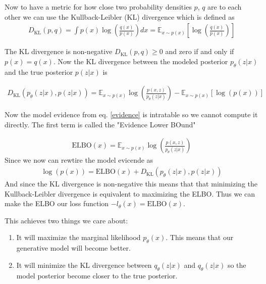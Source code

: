 Now to have a metric for how close two probability densities $p$, $q$ are to each other we can use the Kullback-Leibler (KL) divergence which is defined as
\begin{align}
D_{\text{KL}}(p,q) = \int p(x)\log \left(\frac{q(x)}{p(x)}\right) dx =  \mathbb{E}_{x\sim p(x)}\left[ \log\left(\frac{q(x)}{p(x)}\right)\right]
\end{align}

The KL divergence is non-negative $D_{\text{KL}}(p,q) \geq 0$ and zero if and only if $p(x) = q(x)$. Now the KL divergence  between the modeled posterior $ p_\theta(z|x)$ and the true posterior  $p(z|x)$ is

\begin{align}
    D_{\text{KL}}(p_\theta(z|x),p(z|x)) = \mathbb{E}_{x\sim p(x)} \log\left(\frac{p(x,z)}{p_\theta(z|x)}\right) -  \mathbb{E}_{x\sim p(x)} \left[\log(p(x))\right]
\end{align}

Now the model evidence from eq. \ref{evidence} is intratable so we cannot compute it directly. The first term is called the "Evidence Lower BOund" 

\begin{align}
    \text{ELBO}(x) = \mathbb{E}_{x\sim p(x)} \log\left(\frac{p(x,z)}{p_\theta(z|x)}\right)
\end{align}
Since we now can rewtire the model evicende as 
\begin{align}
    \log(p(x)) = \text{ELBO}(x) +  D_{\text{KL}}(p_\theta(z|x),p(z|x))
\end{align}
And since the KL divergence is non-negative this means that that minimizing the Kullback-Leibler divergence is equivalent to maximizing the ELBO. Thus we can make the ELBO our loss function $-l_\theta(x)=\text{ELBO}(x)$. 

This achieves two things we care about\cite{vaeintro}: 

\begin{enumerate}
    \item It will maximize the marginal likelihood $p_\theta(x)$.
This means that our generative model will become better.
    \item It will minimize the KL divergence between $q_\theta(z|x)$ and $q_\theta(z|x)$ so the model posterior become closer to the true posterior.
\end{enumerate}




